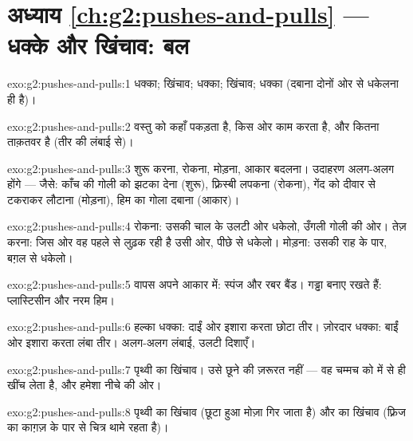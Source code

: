 \section*{अध्याय \ref{ch:g2:pushes-and-pulls} --- धक्के और खिंचाव: बल}

\begin{solution}{exo:g2:pushes-and-pulls:1}
धक्का; खिंचाव; धक्का; खिंचाव; धक्का (दबाना दोनों ओर से धकेलना ही
है)।
\end{solution}

\begin{solution}{exo:g2:pushes-and-pulls:2}
 वस्तु को कहाँ पकड़ता है, किस ओर काम करता है, और कितना ताक़तवर है
(तीर की लंबाई से)।
\end{solution}

\begin{solution}{exo:g2:pushes-and-pulls:3}
शुरू करना, रोकना, मोड़ना, आकार बदलना। उदाहरण अलग-अलग होंगे --- जैसे:
काँच की गोली को झटका देना (शुरू), फ़्रिस्बी लपकना (रोकना), गेंद को
दीवार से टकराकर लौटाना (मोड़ना), हिम का गोला दबाना (आकार)।
\end{solution}

\begin{solution}{exo:g2:pushes-and-pulls:4}
रोकना: उसकी चाल के उलटी ओर धकेलो, उँगली गोली की ओर। तेज़ करना: जिस
ओर वह पहले से लुढ़क रही है उसी ओर, पीछे से धकेलो। मोड़ना: उसकी राह के
पार, बग़ल से धकेलो।
\end{solution}

\begin{solution}{exo:g2:pushes-and-pulls:5}
वापस अपने आकार में: स्पंज और रबर बैंड। गड्ढा बनाए रखते हैं:
प्लास्टिसीन और नरम हिम।
\end{solution}

\begin{solution}{exo:g2:pushes-and-pulls:6}
हल्का धक्का: दाईं ओर इशारा करता छोटा तीर। ज़ोरदार धक्का: बाईं ओर
इशारा करता लंबा तीर। अलग-अलग लंबाई, उलटी दिशाएँ।
\end{solution}

\begin{solution}{exo:g2:pushes-and-pulls:7}
पृथ्वी का खिंचाव। उसे छूने की ज़रूरत नहीं --- वह चम्मच को  में से
ही खींच लेता है, और हमेशा नीचे की ओर।
\end{solution}

\begin{solution}{exo:g2:pushes-and-pulls:8}
पृथ्वी का खिंचाव (छूटा हुआ मोज़ा गिर जाता है) और  का खिंचाव
(फ़्रिज का  काग़ज़ के पार से चित्र थामे रहता है)।
\end{solution}

